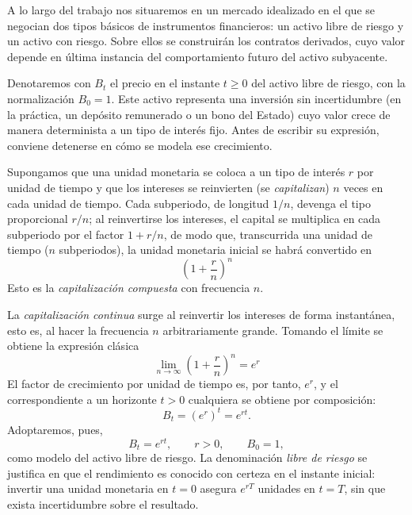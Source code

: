 \documentclass[11pt,a4paper,oneside]{report}
\theoremstyle{plain}
\theoremstyle{definition}
\theoremstyle{remark}
\newcommand{\1}{\mathbf{1}}
\begin{document}
A lo largo del trabajo nos situaremos en un mercado idealizado en el que
se negocian dos tipos básicos de instrumentos financieros: un activo
libre de riesgo y un activo con riesgo. Sobre ellos se construirán los
contratos derivados, cuyo valor depende en última instancia del
comportamiento futuro del activo subyacente.

Denotaremos con $B_t$ el precio
en el instante $t \geq 0$ del activo libre de riesgo, con la
normalización $B_0 = 1$. Este activo representa una inversión sin
incertidumbre (en la práctica, un depósito remunerado o un bono del Estado) cuyo valor crece de manera determinista a un tipo de interés
fijo. Antes de escribir su expresión, conviene detenerse en cómo se
modela ese crecimiento.

Supongamos que una unidad monetaria se coloca a un tipo de interés $r$
por unidad de tiempo y que los intereses se reinvierten (se
\emph{capitalizan}) $n$ veces en cada unidad de tiempo. Cada subperiodo,
de longitud $1/n$, devenga el tipo proporcional $r/n$; al reinvertirse
los intereses, el capital se multiplica en cada subperiodo por el factor
$1 + r/n$, de modo que, transcurrida una unidad de tiempo ($n$
subperiodos), la unidad monetaria inicial se habrá convertido en
\begin{equation*}
  \left(1 + \frac{r}{n}\right)^{n}
\end{equation*}
Esto es la \emph{capitalización compuesta} con frecuencia $n$.

La \emph{capitalización continua} surge al reinvertir los intereses de
forma instantánea, esto es, al hacer la frecuencia $n$ arbitrariamente
grande. Tomando el límite se obtiene la expresión clásica
\begin{equation}\label{eq:limite_e}
  \lim_{n \to \infty}\left(1 + \frac{r}{n}\right)^{n} = e^{r}
\end{equation}
El factor de
crecimiento por unidad de tiempo es, por tanto, $e^{r}$, y el
correspondiente a un horizonte $t > 0$ cualquiera se obtiene por
composición:
\begin{equation*}
  B_t = \left(e^{r}\right)^{t} = e^{rt}.
\end{equation*}
Adoptaremos, pues,
\begin{equation}\label{eq:bono}
  B_t = e^{rt}, \qquad r > 0, \qquad B_0 = 1,
\end{equation}
como modelo del activo libre de riesgo. La denominación \emph{libre de
riesgo} se justifica en que el rendimiento es conocido con certeza en el
instante inicial: invertir una unidad monetaria en $t = 0$ asegura
$e^{rT}$ unidades en $t = T$, sin que exista incertidumbre sobre el resultado.
\end{document}

